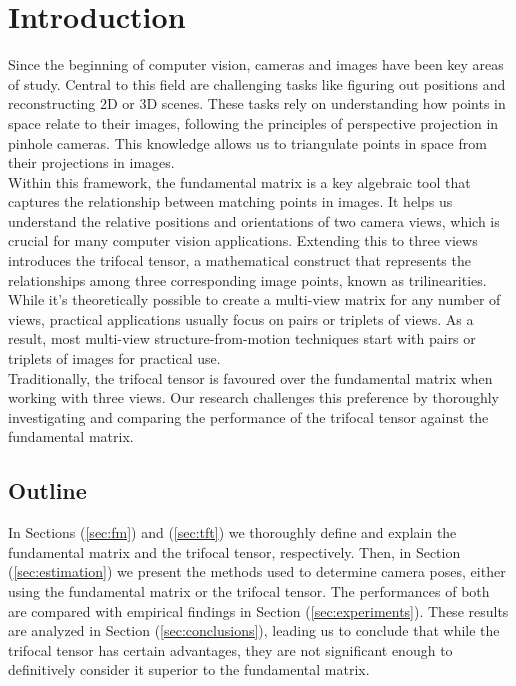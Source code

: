 \section{Introduction}\label{sec:intro}
Since the beginning of computer vision, cameras and images have been key areas of study. Central to this field are challenging tasks like figuring out positions and reconstructing 2D or 3D scenes. These tasks rely on understanding how points in space relate to their images, following the principles of perspective projection in pinhole cameras. This knowledge allows us to triangulate points in space from their projections in images.\\

Within this framework, the fundamental matrix is a key algebraic tool that captures the relationship between matching points in images. It helps us understand the relative positions and orientations of two camera views, which is crucial for many computer vision applications. Extending this to three views introduces the trifocal tensor, a mathematical construct that represents the relationships among three corresponding image points, known as trilinearities. While it's theoretically possible to create a multi-view matrix for any number of views, practical applications usually focus on pairs or triplets of views. As a result, most multi-view structure-from-motion techniques start with pairs or triplets of images for practical use.\\

Traditionally, the trifocal tensor is favoured over the fundamental matrix when working with three views. Our research challenges this preference by thoroughly investigating and comparing the performance of the trifocal tensor against the fundamental matrix.\\

\subsection{Outline}

In Sections (\ref{sec:fm}) and (\ref{sec:tft}) we thoroughly define and explain the fundamental matrix and the trifocal tensor, respectively. Then, in Section (\ref{sec:estimation}) we present the methods used to determine camera poses, either using the fundamental matrix or the trifocal tensor. The performances of both are compared with empirical findings in Section (\ref{sec:experiments}). These results are analyzed in Section (\ref{sec:conclusions}), leading us to conclude that while the trifocal tensor has certain advantages, they are not significant enough to definitively consider it superior to the fundamental matrix.

